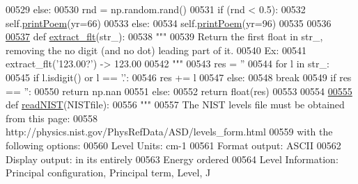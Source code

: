 \begin{DoxyCode}
00529         \textcolor{keywordflow}{else}:
00530             rnd = np.random.rand()
00531             \textcolor{keywordflow}{if} (rnd < 0.5):
00532                 self.\hyperlink{classpyneb_1_1utils_1_1manage__atomic__data_1_1___manage_atomic_data_a780a8f85e8acf64b44b2bce4b4292386}{printPoem}(yr=66)
00533             \textcolor{keywordflow}{else}:
00534                 self.\hyperlink{classpyneb_1_1utils_1_1manage__atomic__data_1_1___manage_atomic_data_a780a8f85e8acf64b44b2bce4b4292386}{printPoem}(yr=96)
00535 
00536 
\hypertarget{manage__atomic__data_8py_source_l00537}{}\hyperlink{namespacepyneb_1_1utils_1_1manage__atomic__data_a211c531a869b2e0789e557b2a15a892c}{00537} \textcolor{keyword}{def }\hyperlink{namespacepyneb_1_1utils_1_1manage__atomic__data_a211c531a869b2e0789e557b2a15a892c}{extract\_flt}(str\_):
00538     \textcolor{stringliteral}{"""}
00539 \textcolor{stringliteral}{    Return the first float in str\_, removing the no digit (and no dot) leading part of it.}
00540 \textcolor{stringliteral}{    Ex:}
00541 \textcolor{stringliteral}{    extract\_flt('123.00?') -> 123.00}
00542 \textcolor{stringliteral}{    """}
00543     res = \textcolor{stringliteral}{''}
00544     \textcolor{keywordflow}{for} l \textcolor{keywordflow}{in} str\_:
00545         \textcolor{keywordflow}{if} l.isdigit() \textcolor{keywordflow}{or} l == \textcolor{stringliteral}{'.'}:
00546             res += l
00547         \textcolor{keywordflow}{else}:
00548             \textcolor{keywordflow}{break}
00549     \textcolor{keywordflow}{if} res == \textcolor{stringliteral}{''}:
00550         \textcolor{keywordflow}{return} np.nan
00551     \textcolor{keywordflow}{else}:
00552         \textcolor{keywordflow}{return} float(res)
00553 
00554 
\hypertarget{manage__atomic__data_8py_source_l00555}{}\hyperlink{namespacepyneb_1_1utils_1_1manage__atomic__data_ab843a6f51ebb888e83a849835e49a885}{00555} \textcolor{keyword}{def }\hyperlink{namespacepyneb_1_1utils_1_1manage__atomic__data_ab843a6f51ebb888e83a849835e49a885}{readNIST}(NISTfile):
00556     \textcolor{stringliteral}{"""}
00557 \textcolor{stringliteral}{    The NIST levels file must be obtained from this page:}
00558 \textcolor{stringliteral}{        http://physics.nist.gov/PhysRefData/ASD/levels\_form.html}
00559 \textcolor{stringliteral}{    with the following options:}
00560 \textcolor{stringliteral}{        Level Units: cm-1}
00561 \textcolor{stringliteral}{        Format output: ASCII}
00562 \textcolor{stringliteral}{        Display output: in its entirely}
00563 \textcolor{stringliteral}{        Energy ordered}
00564 \textcolor{stringliteral}{        Level Information: Principal configuration, Principal term, Level, J}

\end{DoxyCode}

